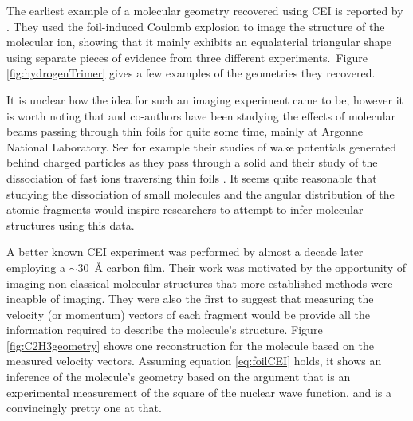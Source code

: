 The earliest example of a molecular geometry recovered using CEI is reported by \citet{Gaillard78}. They used the foil-induced Coulomb explosion to image the structure of the  molecular ion, showing that it mainly exhibits an equalaterial triangular shape using separate pieces of evidence from three different experiments.\footnotemark ~Figure \ref{fig:hydrogenTrimer} gives a few examples of the geometries they recovered.


It is unclear how the idea for such an imaging experiment came to be, however it is worth noting that \citet{Gaillard78} and co-authors have been studying the effects of molecular beams passing through thin foils for quite some time, mainly at Argonne National Laboratory. See for example their studies of wake potentials generated behind charged particles as they pass through a solid \citep{Gemmell75, Vager76PRL} and their study of the dissociation of fast  ions traversing thin foils \citep{Vager76PRA}. It seems quite reasonable that studying the dissociation of small molecules and the angular distribution of the atomic fragments would inspire researchers to attempt to infer molecular structures using this data.

A better known CEI experiment was performed by \citet{Vager89} almost a decade later employing a $\sim$\SI{30}{\angstrom} carbon film. Their work was motivated by the opportunity of imaging non-classical molecular structures that more established methods were incapble of imaging. They were also the first to suggest that measuring the velocity (or momentum) vectors of each fragment would be provide all the information required to describe the molecule's structure. Figure \ref{fig:C2H3geometry} shows one reconstruction for the  molecule based on the measured velocity vectors. Assuming equation \eqref{eq:foilCEI} holds, it shows an inference of the molecule's geometry based on the argument that is an experimental measurement of the square of the nuclear wave function, and is a convincingly pretty one at that.

